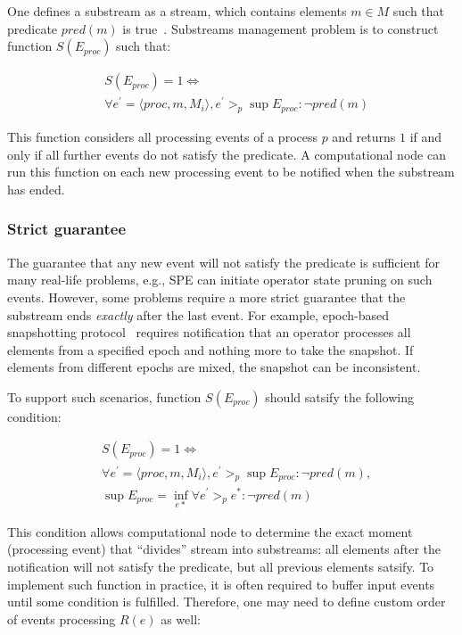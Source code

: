 One defines a substream as a stream, which contains elements $m \in M$ such that predicate $pred(m)$ is true~\cite{Tucker:2003:EPS:776752.776780}. Substreams management problem is to construct function $S(E_{proc})$ such that:

\begin{align*}
& S(E_{proc}) = 1 \Longleftrightarrow \\ 
& \forall e^{'} = \langle proc,m,M_i\rangle, e^{'} >_p \sup E_{proc} : \neg pred(m)
\end{align*}

This function considers all processing events of a process $p$ and returns $1$ if and only if all further events do not satisfy the predicate. A computational node can run this function on each new processing event to be notified when the substream has ended.

\subsubsection{Strict guarantee}

The guarantee that any new event will not satisfy the predicate is sufficient for many real-life problems, e.g., SPE can initiate operator state pruning on such events. However, some problems require a more strict guarantee that the substream ends {\em exactly} after the last event. For example, epoch-based snapshotting protocol~\cite{2015arXiv150608603C, jacques2016consistent} requires notification that an operator processes all elements from a specified epoch and nothing more to take the snapshot. If elements from different epochs are mixed, the snapshot can be inconsistent.

To support such scenarios, function $S(E_{proc})$ should satsify the following condition:

\begin{align*}
& S(E_{proc}) = 1  \Longleftrightarrow \\
& \forall e^{'} = \langle proc,m,M_i\rangle, e^{'} >_p \sup E_{proc} : \neg pred(m), \\
& \sup E_{proc} = \inf_{e*} \forall e^{'} >_p e^{*} : \neg pred(m) 
\end{align*}

This condition allows computational node to determine the exact moment (processing event) that ``divides'' stream into substreams: all elements after the notification will not satisfy the predicate, but all previous elements satsify. To implement such function in practice, it is often required to buffer input events until some condition is fulfilled. Therefore, one may need to define custom order of events processing $R(e)$ as well:

